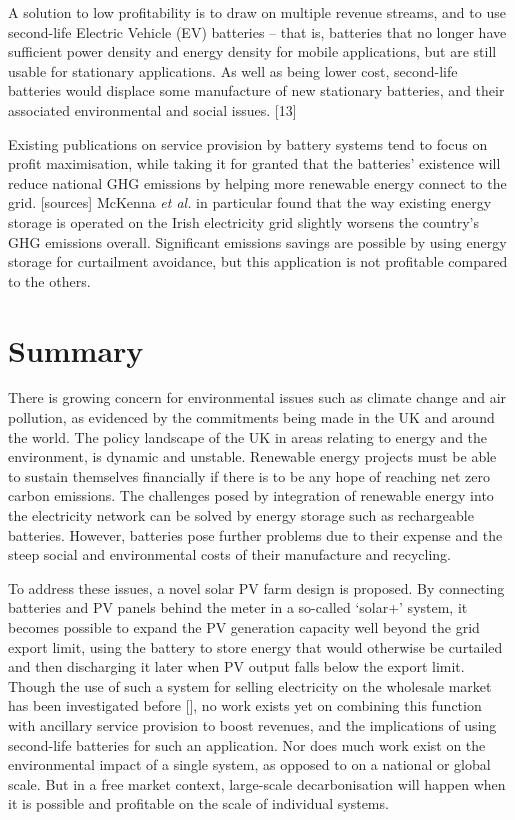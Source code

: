 \documentclass[report_18month.tex]{subfiles}
\begin{document}
A solution to low profitability is to draw on multiple revenue streams, and to use second-life Electric Vehicle (EV) batteries – that is, batteries that no longer have sufficient power density and energy density for mobile applications, but are still usable for stationary applications. As well as being lower cost, second-life batteries would displace some manufacture of new stationary batteries, and their associated environmental and social issues. [13]

Existing publications on service provision by battery systems tend to focus on profit maximisation, while taking it for granted that the batteries' existence will reduce national GHG emissions by helping more renewable energy connect to the grid. [sources] McKenna \emph{et al.} in particular found that the way existing energy storage is operated on the Irish electricity grid slightly worsens the country's GHG emissions overall. Significant emissions savings are possible by using energy storage for curtailment avoidance, but this application is not profitable compared to the others.

\section{Summary}
There is growing concern for environmental issues such as climate change and air pollution, as evidenced by the commitments being made in the UK and around the world. The policy landscape of the UK in areas relating to energy and the environment, is dynamic and unstable. Renewable energy projects must be able to sustain themselves financially if there is to be any hope of reaching net zero carbon emissions. The challenges posed by integration of renewable energy into the electricity network can be solved by energy storage such as rechargeable batteries. However, batteries pose further problems due to their expense and the steep social and environmental costs of their manufacture and recycling.

To address these issues, a novel solar PV farm design is proposed. By connecting batteries and PV panels behind the meter in a so-called `solar+' system, it becomes possible to expand the PV generation capacity well beyond the grid export limit, using the battery to store energy that would otherwise be curtailed and then discharging it later when PV output falls below the export limit. Though the use of such a system for selling electricity on the wholesale market has been investigated before [], no work exists yet on combining this function with ancillary service provision to boost revenues, and the implications of using second-life batteries for such an application. Nor does much work exist on the environmental impact of a single system, as opposed to on a national or global scale. But in a free market context, large-scale decarbonisation will happen when it is possible and profitable on the scale of individual systems.
\end{document}
